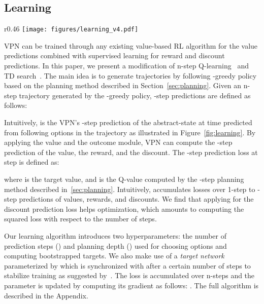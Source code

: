 \documentclass{article}
\newcommand{\supplementary}{Appendix}
\newcommand{\cutsubsectionup}{\vspace*{-0.04in}}
\newcommand{\cutsubsectiondown}{\vspace*{-0.03in}}
\begin{document}
\cutsubsectionup
\subsection{Learning} \label{sec:learning}
\cutsubsectiondown
\begin{wrapfigure}{r}{0.46\textwidth}
    \vspace{-10pt}
    \centering
\texttt{[image: figures/learning\_v4.pdf]}
	\caption{Illustration of learning process. } 
	\label{fig:learning}	
	\vspace{-5pt}
\end{wrapfigure}
VPN can be trained through any existing value-based RL algorithm for the value predictions combined with supervised learning for reward and discount predictions. In this paper, we present a modification of n-step Q-learning~\citep{mnih2016asynchronous} and TD search~\citep{Silver2012TemporaldifferenceSI}. The main idea is to generate trajectories by following -greedy policy based on the planning method described in Section~\ref{sec:planning}. 
Given an n-step trajectory  generated by the -greedy policy, -step predictions are defined as follows:

Intuitively,  is the VPN's -step prediction of the abstract-state at time  predicted from  following options  in the trajectory as illustrated in Figure~\ref{fig:learning}. By applying the value and the outcome module, VPN can compute the -step prediction of the value, the reward, and the discount. The -step prediction loss at step  is defined as:

where  is the target value, and  is the Q-value computed by the -step planning method described in~\ref{sec:planning}. Intuitively,  accumulates losses over 1-step to -step predictions of values, rewards, and discounts. We find that applying  for the discount prediction loss helps optimization, which amounts to computing the squared loss with respect to the number of steps. 


Our learning algorithm introduces two hyperparameters: the number of prediction steps () and planning depth () used for choosing options and computing bootstrapped targets. We also make use of a \textit{target network} parameterized by  which is synchronized with  after a certain number of steps to stabilize training as suggested by~\cite{mnih2016asynchronous}. The loss is accumulated over n-steps and the parameter is updated by computing its gradient as follows: .
The full algorithm is described in the \supplementary.
\end{document}
